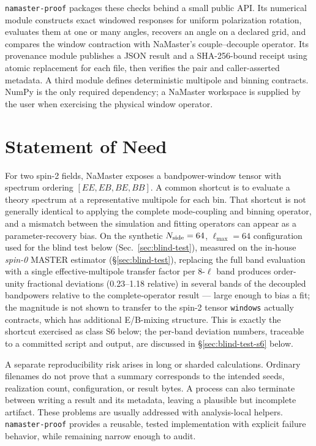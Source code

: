 \documentclass[11pt]{article}
\newcommand{\software}{\texttt{namaster-proof}}
\begin{document}
\software{} packages these checks behind a small public API.  Its numerical
module constructs exact windowed responses for uniform polarization rotation,
evaluates them at one or many angles, recovers an angle on a declared grid,
and compares the window contraction with NaMaster's couple--decouple operator.
Its provenance module publishes a JSON result and a SHA-256-bound receipt using
atomic replacement for each file, then verifies the pair and caller-asserted
metadata.  A third module defines
deterministic multipole and binning contracts.  NumPy is the only required
dependency; a NaMaster workspace is supplied by the user when exercising the
physical window operator.

\section{Statement of Need}

For two spin-2 fields, NaMaster exposes a bandpower-window tensor with spectrum
ordering \([EE,EB,BE,BB]\).  A common shortcut is to evaluate a theory
spectrum at a representative multipole for each bin.  That shortcut is not
generally identical to applying the complete mode-coupling and binning
operator, and a mismatch between the simulation and fitting operators can
appear as a parameter-recovery bias.  On the synthetic \(N_{\rm side}=64\),
\(\ell_{\max}=64\) configuration used for the blind test below
(Sec.~\ref{sec:blind-test}), measured on the in-house
\emph{spin-0} MASTER estimator (\S\ref{sec:blind-test}), replacing the full band evaluation with a single
effective-multipole transfer factor per 8-\(\ell\) band produces
order-unity fractional deviations (0.23--1.18 relative) in several bands of the decoupled
bandpowers relative to the complete-operator result --- large enough to bias
a fit; the magnitude is not shown to transfer to the spin-2 tensor
\texttt{windows} actually contracts, which has additional E/B-mixing
structure.  This is exactly the shortcut exercised as class S6 below; the
per-band deviation numbers, traceable to a committed script and output, are
discussed in \S\ref{sec:blind-test-s6} below.

A separate reproducibility risk arises in long or sharded calculations.
Ordinary filenames do not prove that a summary corresponds to the intended
seeds, realization count, configuration, or result bytes.  A process can also
terminate between writing a result and its metadata, leaving a plausible but
incomplete artifact.  These problems are usually addressed with analysis-local
helpers.  \software{} provides a reusable, tested implementation with explicit
failure behavior, while remaining narrow enough to audit.
\end{document}
